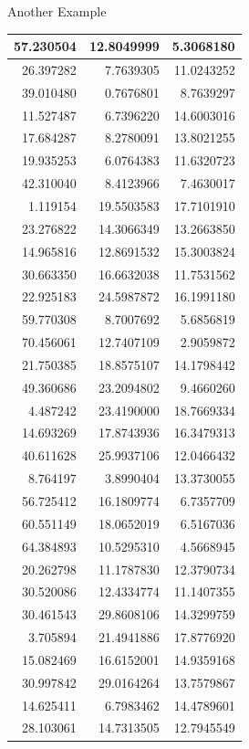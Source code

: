 \documentclass[
  ignorenonframetext,
]{beamer}
\begin{document}
\begin{frame}{Another Example}
\begin{table}
\begin{tabular}[t]{r|r|r}
\hline
57.230504 & 12.8049999 & 5.3068180\\
\hline
26.397282 & 7.7639305 & 11.0243252\\
\hline
39.010480 & 0.7676801 & 8.7639297\\
\hline
11.527487 & 6.7396220 & 14.6003016\\
\hline
17.684287 & 8.2780091 & 13.8021255\\
\hline
19.935253 & 6.0764383 & 11.6320723\\
\hline
42.310040 & 8.4123966 & 7.4630017\\
\hline
1.119154 & 19.5503583 & 17.7101910\\
\hline
23.276822 & 14.3066349 & 13.2663850\\
\hline
14.965816 & 12.8691532 & 15.3003824\\
\hline
30.663350 & 16.6632038 & 11.7531562\\
\hline
22.925183 & 24.5987872 & 16.1991180\\
\hline
59.770308 & 8.7007692 & 5.6856819\\
\hline
70.456061 & 12.7407109 & 2.9059872\\
\hline
21.750385 & 18.8575107 & 14.1798442\\
\hline
49.360686 & 23.2094802 & 9.4660260\\
\hline
4.487242 & 23.4190000 & 18.7669334\\
\hline
14.693269 & 17.8743936 & 16.3479313\\
\hline
40.611628 & 25.9937106 & 12.0466432\\
\hline
8.764197 & 3.8990404 & 13.3730055\\
\hline
56.725412 & 16.1809774 & 6.7357709\\
\hline
60.551149 & 18.0652019 & 6.5167036\\
\hline
64.384893 & 10.5295310 & 4.5668945\\
\hline
20.262798 & 11.1787830 & 12.3790734\\
\hline
30.520086 & 12.4334774 & 11.1407355\\
\hline
30.461543 & 29.8608106 & 14.3299759\\
\hline
3.705894 & 21.4941886 & 17.8776920\\
\hline
15.082469 & 16.6152001 & 14.9359168\\
\hline
30.997842 & 29.0164264 & 13.7579867\\
\hline
14.625411 & 6.7983462 & 14.4789601\\
\hline
28.103061 & 14.7313505 & 12.7945549\\

\end{tabular}
\end{table}
\end{frame}
\end{document}
